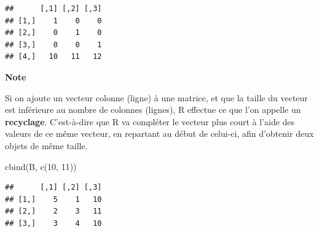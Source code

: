 \documentclass[
  11pt,
]{book}
\newenvironment{Shaded}{\begin{snugshade}}{\end{snugshade}}
\newcommand{\DecValTok}[1]{\textcolor[rgb]{0.00,0.00,0.81}{#1}}
\newcommand{\FunctionTok}[1]{\textcolor[rgb]{0.00,0.00,0.00}{#1}}
\newcommand{\NormalTok}[1]{#1}
\numberwithin{equation}{section}
\numberwithin{countremarque}{section}
\newenvironment{notebox}{
  \begin{tcolorbox}[breakable, colback=jaune,coltext=black,
                  colframe=grisfonce]}
 {\end{tcolorbox}}
\begin{document}
\begin{lstlisting}
##      [,1] [,2] [,3]
## [1,]    1    0    0
## [2,]    0    1    0
## [3,]    0    0    1
## [4,]   10   11   12
\end{lstlisting}

\begin{notebox}

\textbf{Note}

Si on ajoute un vecteur colonne (ligne) à une matrice, et que la taille du vecteur est inférieure au nombre de colonnes (lignes), R effectue ce que l'on appelle un \textbf{recyclage}. C'est-à-dire que R va compléter le vecteur plus court à l'aide des valeurs de ce même vecteur, en repartant au début de celui-ci, afin d'obtenir deux objets de même taille.

\begin{Shaded}
\begin{Highlighting}[]
\FunctionTok{cbind}\NormalTok{(B, }\FunctionTok{c}\NormalTok{(}\DecValTok{10}\NormalTok{, }\DecValTok{11}\NormalTok{))}
\end{Highlighting}
\end{Shaded}

\begin{lstlisting}
##      [,1] [,2] [,3]
## [1,]    5    1   10
## [2,]    2    3   11
## [3,]    3    4   10
\end{lstlisting}

\end{notebox}
\end{document}
